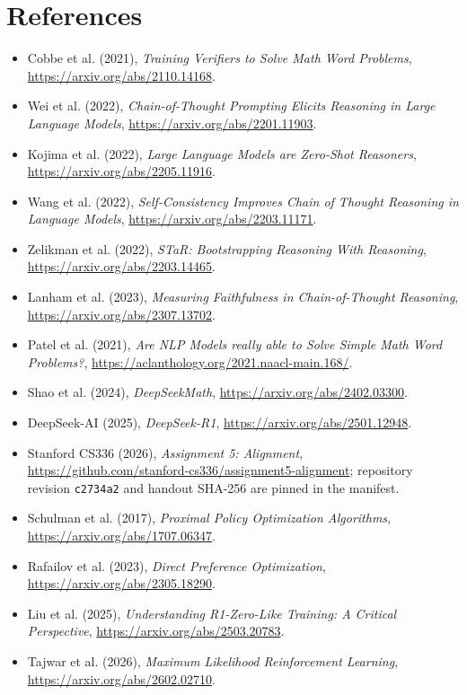 \documentclass[11pt]{article}
\begin{document}
\section{References}
\footnotesize
\begin{itemize}\setlength{\itemsep}{0pt}\setlength{\parskip}{0pt}
\item Cobbe et al. (2021), \emph{Training Verifiers to Solve Math Word Problems}, \url{https://arxiv.org/abs/2110.14168}.
\item Wei et al. (2022), \emph{Chain-of-Thought Prompting Elicits Reasoning in Large Language Models}, \url{https://arxiv.org/abs/2201.11903}.
\item Kojima et al. (2022), \emph{Large Language Models are Zero-Shot Reasoners}, \url{https://arxiv.org/abs/2205.11916}.
\item Wang et al. (2022), \emph{Self-Consistency Improves Chain of Thought Reasoning in Language Models}, \url{https://arxiv.org/abs/2203.11171}.
\item Zelikman et al. (2022), \emph{STaR: Bootstrapping Reasoning With Reasoning}, \url{https://arxiv.org/abs/2203.14465}.
\item Lanham et al. (2023), \emph{Measuring Faithfulness in Chain-of-Thought Reasoning}, \url{https://arxiv.org/abs/2307.13702}.
\item Patel et al. (2021), \emph{Are NLP Models really able to Solve Simple Math Word Problems?}, \url{https://aclanthology.org/2021.naacl-main.168/}.
\item Shao et al. (2024), \emph{DeepSeekMath}, \url{https://arxiv.org/abs/2402.03300}.
\item DeepSeek-AI (2025), \emph{DeepSeek-R1}, \url{https://arxiv.org/abs/2501.12948}.
\item Stanford CS336 (2026), \emph{Assignment 5: Alignment}, \url{https://github.com/stanford-cs336/assignment5-alignment}; repository revision \texttt{c2734a2} and handout SHA-256 are pinned in the manifest.
\item Schulman et al. (2017), \emph{Proximal Policy Optimization Algorithms}, \url{https://arxiv.org/abs/1707.06347}.
\item Rafailov et al. (2023), \emph{Direct Preference Optimization}, \url{https://arxiv.org/abs/2305.18290}.
\item Liu et al. (2025), \emph{Understanding R1-Zero-Like Training: A Critical Perspective}, \url{https://arxiv.org/abs/2503.20783}.
\item Tajwar et al. (2026), \emph{Maximum Likelihood Reinforcement Learning}, \url{https://arxiv.org/abs/2602.02710}.

\end{itemize}
\end{document}
